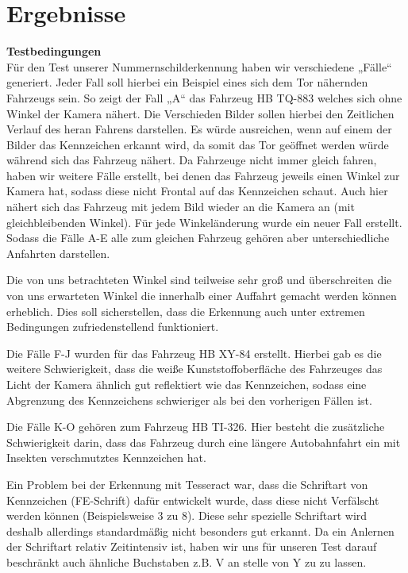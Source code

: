 \documentclass{../Vorlage/sebDenCls}
\begin{document}
\section{Ergebnisse}
\textbf{Testbedingungen} \\
Für den Test unserer Nummernschilderkennung haben wir verschiedene „Fälle“ generiert. Jeder Fall soll hierbei ein Beispiel eines sich dem Tor nähernden Fahrzeugs sein. So zeigt der Fall „A“ das Fahrzeug HB TQ-883 welches sich ohne Winkel der Kamera nähert. Die Verschieden Bilder sollen hierbei den Zeitlichen Verlauf des heran Fahrens darstellen. Es würde ausreichen, wenn auf einem der Bilder das Kennzeichen erkannt wird, da somit das Tor geöffnet werden würde während sich das Fahrzeug nähert. Da Fahrzeuge nicht immer gleich fahren, haben wir weitere Fälle erstellt, bei denen das Fahrzeug jeweils einen Winkel zur Kamera hat, sodass diese nicht Frontal auf das Kennzeichen schaut. Auch hier nähert sich das Fahrzeug mit jedem Bild wieder an die Kamera an (mit gleichbleibenden Winkel). Für jede Winkeländerung wurde ein neuer Fall erstellt.
Sodass die Fälle A-E alle zum gleichen Fahrzeug gehören aber unterschiedliche Anfahrten darstellen.

Die von uns betrachteten Winkel sind teilweise sehr groß und überschreiten die von uns erwarteten Winkel die innerhalb einer Auffahrt gemacht werden können erheblich. Dies soll sicherstellen, dass die Erkennung auch unter extremen Bedingungen zufriedenstellend funktioniert.

Die Fälle F-J wurden für das Fahrzeug HB XY-84 erstellt. Hierbei gab es die weitere Schwierigkeit, dass die weiße Kunststoffoberfläche des Fahrzeuges das Licht der Kamera ähnlich gut reflektiert wie das Kennzeichen, sodass eine Abgrenzung des Kennzeichens schwieriger als bei den vorherigen Fällen ist.

Die Fälle K-O gehören zum Fahrzeug HB TI-326. Hier besteht die zusätzliche Schwierigkeit darin, dass das Fahrzeug durch eine längere Autobahnfahrt ein mit Insekten verschmutztes Kennzeichen hat.

Ein Problem bei der Erkennung mit Tesseract war, dass die Schriftart von Kennzeichen (FE-Schrift)  dafür entwickelt wurde, dass diese nicht Verfälscht werden können (Beispielsweise 3 zu 8). Diese sehr spezielle Schriftart wird deshalb allerdings standardmäßig nicht besonders gut erkannt. Da ein Anlernen der Schriftart relativ Zeitintensiv ist, haben wir uns für unseren Test darauf beschränkt auch ähnliche Buchstaben z.B. V an stelle von Y zu zu lassen.
\end{document}

